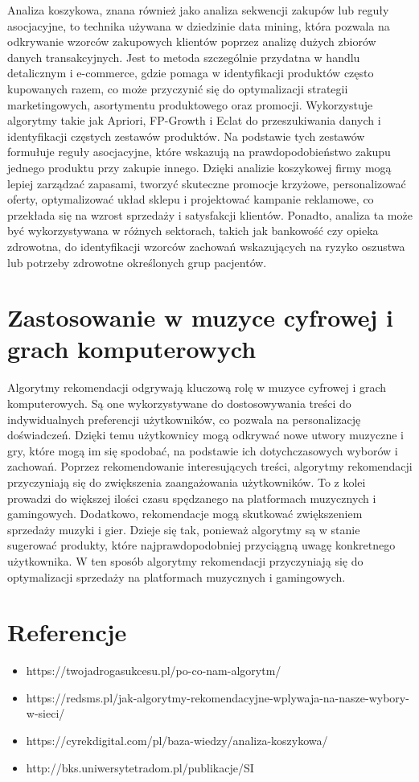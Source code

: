 \documentclass{article}
\begin{document}
Analiza koszykowa, znana również jako analiza sekwencji zakupów lub reguły asocjacyjne, to technika używana w dziedzinie data mining, która pozwala na odkrywanie wzorców zakupowych 
klientów poprzez analizę dużych zbiorów danych transakcyjnych. Jest to metoda szczególnie przydatna w handlu detalicznym i e-commerce, gdzie pomaga w identyfikacji produktów często 
kupowanych razem, co może przyczynić się do optymalizacji strategii marketingowych, asortymentu produktowego oraz promocji. Wykorzystuje algorytmy takie jak Apriori, FP-Growth 
i Eclat do przeszukiwania danych i identyfikacji częstych zestawów produktów. Na podstawie tych zestawów formułuje reguły asocjacyjne, które wskazują na prawdopodobieństwo zakupu 
jednego produktu przy zakupie innego. \newline
Dzięki analizie koszykowej firmy mogą lepiej zarządzać zapasami, tworzyć skuteczne promocje krzyżowe, personalizować oferty, optymalizować układ sklepu i projektować kampanie 
reklamowe, co przekłada się na wzrost sprzedaży i satysfakcji klientów. Ponadto, analiza ta może być wykorzystywana w różnych sektorach, takich jak bankowość czy opieka zdrowotna, 
do identyfikacji wzorców zachowań wskazujących na ryzyko oszustwa lub potrzeby zdrowotne określonych grup pacjentów.

\section{Zastosowanie w muzyce cyfrowej i grach komputerowych}

Algorytmy rekomendacji odgrywają kluczową rolę w muzyce cyfrowej i grach komputerowych. Są one wykorzystywane do dostosowywania treści do indywidualnych preferencji użytkowników, 
co pozwala na personalizację doświadczeń. Dzięki temu użytkownicy mogą odkrywać nowe utwory muzyczne i gry, które mogą im się spodobać, na podstawie ich dotychczasowych wyborów 
i zachowań.\newline
Poprzez rekomendowanie interesujących treści, algorytmy rekomendacji przyczyniają się do zwiększenia zaangażowania użytkowników. To z kolei prowadzi do większej ilości czasu 
spędzanego na platformach muzycznych i gamingowych.
Dodatkowo, rekomendacje mogą skutkować zwiększeniem sprzedaży muzyki i gier. Dzieje się tak, ponieważ algorytmy są w stanie sugerować produkty, które najprawdopodobniej przyciągną 
uwagę konkretnego użytkownika. W ten sposób algorytmy rekomendacji przyczyniają się do optymalizacji sprzedaży na platformach muzycznych i gamingowych.
\section{Referencje}
\begin{itemize}
    \item https://twojadrogasukcesu.pl/po-co-nam-algorytm/
    \item https://redsms.pl/jak-algorytmy-rekomendacyjne-wplywaja-na-nasze-wybory-w-sieci/
    \item https://cyrekdigital.com/pl/baza-wiedzy/analiza-koszykowa/
    \item http://bks.uniwersytetradom.pl/publikacje/SI%

    
\end{itemize}
\end{document}
